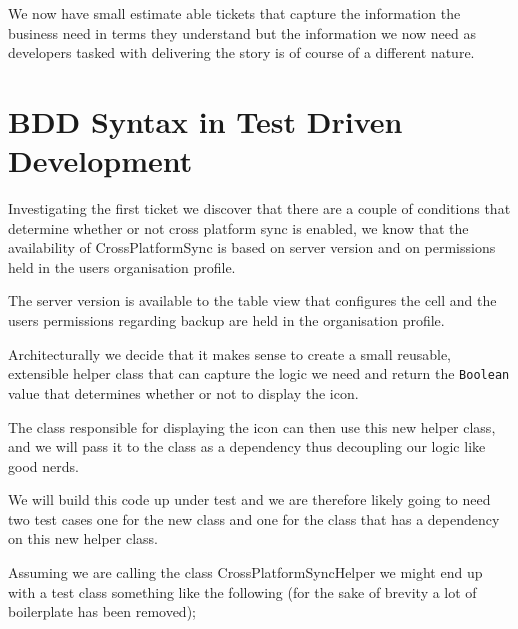 \documentclass[a4paper, titlepage]{article}
\begin{document}
  We now have small estimate able tickets that capture the information the
  business need in terms they understand but the information we now need
  as developers tasked with delivering the story is of course of a
  different nature.  

\section{BDD Syntax in Test Driven Development}

  Investigating the first ticket we discover that there are a couple of
  conditions that determine whether or not cross platform sync is
  enabled, we know that the availability of CrossPlatformSync is based
  on server version and on permissions held in the users organisation
  profile.

  The server version is available to the table view that configures the
  cell and the users permissions regarding backup are held in the
  organisation profile.

  Architecturally we decide that it makes sense to create a
  small reusable, extensible helper class that can capture the logic
  we need and return the \texttt{Boolean} value that determines whether or not to
  display the icon. 
  
  The class responsible for displaying the icon can
  then use this new helper class, and we will pass it to the class as a
  dependency thus decoupling our logic like good nerds.

  We will build this code up under test and we are therefore likely
  going to need two test cases one for the new class and one for the
  class that has a dependency on this new helper class.

  Assuming we are calling the class CrossPlatformSyncHelper we might
  end up with a test class something like the following (for the sake of
  brevity a lot of boilerplate has been removed);
\end{document}
